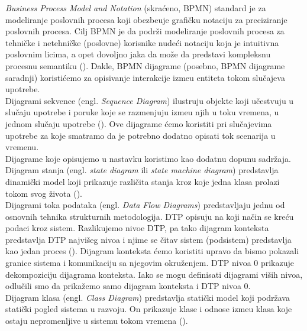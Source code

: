 \textit{Business Process Model and Notation} (skra\' ceno, BPMN) standard je za modeliranje poslovnih procesa koji obezbe\dj uje grafi\v cku notaciju za preciziranje poslovnih procesa. Cilj BPMN je da podr\v zi modeliranje poslovnih procesa za tehni\v cke i netehni\v cke (poslovne) korisnike nude\' ci notaciju koja je intuitivna poslovnim licima, a opet dovoljno jaka da mo\v ze da predstavi kompleksnu procesnu semantiku (\cite{BPMN}). Dakle, BPMN dijagrame (posebno, BPMN dijagrame saradnji) koristi\' cemo za opisivanje interakcije izme\dj u entiteta tokom slu\v cajeva upotrebe.\\

Dijagrami sekvence (engl. \textit{Sequence Diagram}) ilustruju objekte koji u\v cestvuju u slu\v caju upotrebe i poruke koje se razmenjuju izme\dj u njih u toku vremena, u jednom slu\v caju upotrebe (\cite{SAAD}). Ove dijagrame \' cemo koristiti pri slu\v cajevima upotrebe za koje smatramo da je potrebno dodatno opisati tok scenarija u vremenu.\\

Dijagrame koje opisujemo u nastavku koristimo kao dodatnu dopunu sadr\v zaja.\\

Dijagram stanja (engl. \textit{state diagram} ili \textit{state machine diagram}) predstavlja dinami\v cki model koji prikazuje razli\v cita stanja kroz koje jedna klasa prolazi tokom svog \v zivota (\cite{SAAD}).\\

Dijagrami toka podataka (engl. \textit{Data Flow Diagrams}) predstavljaju jednu od osnovnih tehnika strukturnih metodologija. DTP opisuju na koji na\v cin se kre\' cu podaci kroz sistem. Razlikujemo nivoe DTP, pa tako dijagram konteksta predstavlja DTP najvi\v seg nivoa i njime se \v citav sistem (podsistem) predstavlja kao jedan proces (\cite{smalkov-slajdovi}). Dijagram konteksta \' cemo koristiti upravo da bismo pokazali granice sistema i komunikaciju sa njegovim okru\v zenjem. DTP nivoa 0 prikazuje dekompoziciju dijagrama konteksta. Iako se mogu definisati dijagrami vi\v sih nivoa, odlu\v cili smo da prika\v zemo samo dijagram konteksta i DTP nivoa 0.\\

Dijagram klasa (engl. \textit{Class Diagram}) predstavlja stati\v cki model koji podr\v zava stati\v cki pogled sistema u razvoju. On prikazuje klase i odnose izme\dj u klasa koje ostaju nepromenljive u sistemu tokom vremena (\cite{SAAD}).\\


